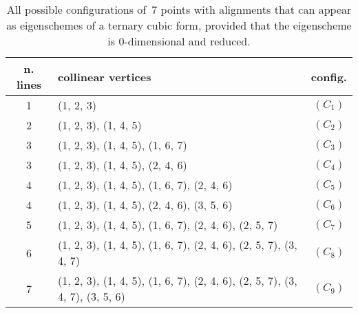 \documentclass[a4paper, 11pt, reqno]{amsart}
\theoremstyle{plain}
\theoremstyle{definition}
\begin{document}
\begin{table}[ht]
\caption{All possible configurations of~$7$ points with alignments that can appear as eigenschemes of a ternary cubic form, provided that the eigenscheme is $0$-dimensional and reduced.}
\centering
\begin{tabular}{|clc|}\hline
  n. lines & collinear vertices & config.\\ \hline
 1& (1, 2, 3) &  $(C_1)$\\
 2& (1, 2, 3), (1, 4, 5) &  $(C_2)$\\
 3& (1, 2, 3), (1, 4, 5), (1, 6, 7) & $(C_3)$\\
 3& (1, 2, 3), (1, 4, 5), (2, 4, 6) & $(C_4)$\\
 4& (1, 2, 3), (1, 4, 5), (1, 6, 7), (2, 4, 6) & $(C_5)$\\
 4& (1, 2, 3), (1, 4, 5), (2, 4, 6), (3, 5, 6) & $(C_6)$\\
 5& (1, 2, 3), (1, 4, 5), (1, 6, 7), (2, 4, 6), (2, 5, 7)& $(C_7)$\\
 6& (1, 2, 3), (1, 4, 5), (1, 6, 7), (2, 4, 6), (2, 5, 7), (3, 4, 7)& $(C_8)$\\
 7& (1, 2, 3), (1, 4, 5), (1, 6, 7), (2, 4, 6), (2, 5, 7), (3, 4, 7), (3, 5, 6) &  $(C_9)$\\ \hline
\end{tabular}
\label{table:all_alignments}
\end{table}
%
\end{document}
